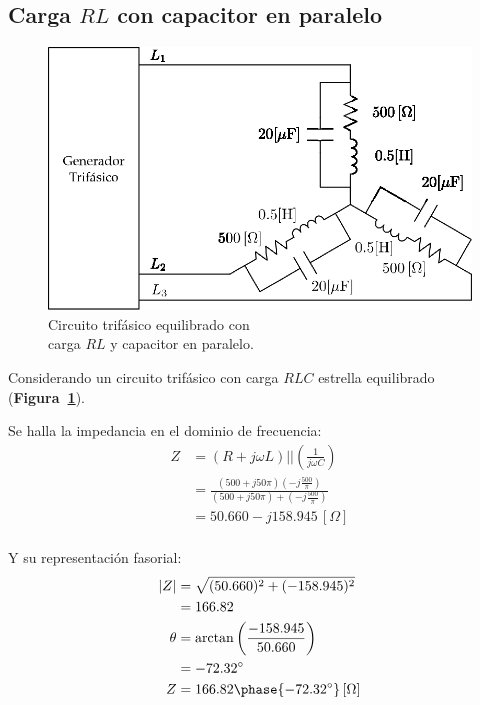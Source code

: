 \documentclass[letter,11pt]{article}
\begin{document}
\subsection{Carga $RL$ con capacitor en paralelo}
\begin{figure}[!h]
\centering
\includegraphics[scale=0.9]{figura3.eps}
\caption{Circuito trifásico equilibrado con \\
carga $RL$ y capacitor en paralelo.}
\label{circuito3}
\end{figure}

Considerando un circuito trifásico con carga $RLC$ estrella equilibrado
(\textbf{Figura~\ref{circuito3}}).

Se halla la impedancia en el dominio de frecuencia:
\begin{equation*}
    \begin{split}
        Z &= (R+j\omega L)||(\frac{1}{j\omega C})\\
          &= \frac{(500+j50\pi)(-j\frac{500}{\pi})}
             {(500+j50\pi)+(-j\frac{500}{\pi})}\\
          &= 50.660-j158.945\,[\Omega]\\
    \end{split}
\end{equation*}

Y su representación fasorial:
\begin{equation*}
    \begin{split}
        |Z| &= \sqrt{(50.660)^2+(-158.945)^2}\\
            &= 166.82\\
        \theta &= \arctan\left(\frac{-158.945}{50.660}\right)\\
               &= -72.32^{\circ}\\
        Z &= 166.82\phase{-72.32^{\circ}}\,[\Omega]\\
    \end{split}
\end{equation*}
\end{document}
